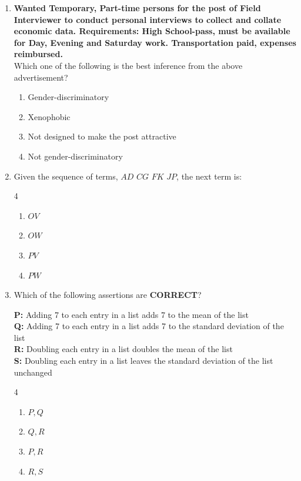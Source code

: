 \documentclass[journal]{IEEEtran}
\begin{document}
\begin{enumerate}
    \item[Q.62] \textbf{Wanted Temporary, Part-time persons for the post of Field Interviewer to conduct personal interviews to collect and collate economic data. Requirements: High School-pass, must be available for Day, Evening and Saturday work. Transportation paid, expenses reimbursed.} \\

     Which one of the following is the best inference from the above advertisement? 
    

    \begin{enumerate}
        \item Gender-discriminatory
        \item Xenophobic
        \item Not designed to make the post attractive
        \item Not gender-discriminatory
    \end{enumerate}
    

    \item[Q.63] Given the sequence of terms, $AD$ $CG$ $FK$ $JP$, the next term is:
\begin{multicols}{4}
    

    \begin{enumerate}
        \item $OV$
        \item $OW$
        \item $PV$
        \item $PW$
    \end{enumerate}
    \end{multicols}

    \item[Q.64] Which of the following assertions are \textbf{CORRECT}?

    \textbf{P:} Adding 7 to each entry in a list adds 7 to the mean of the list \\
    \textbf{Q:} Adding 7 to each entry in a list adds 7 to the standard deviation of the list \\
    \textbf{R:} Doubling each entry in a list doubles the mean of the list \\
    \textbf{S:} Doubling each entry in a list leaves the standard deviation of the list unchanged
\begin{multicols}{4}
    

    \begin{enumerate}
        \item $P, Q$
        \item $Q, R$
        \item $P, R$
        \item $R, S$
    \end{enumerate}
    \end{multicols}


\end{enumerate}
\end{document}
